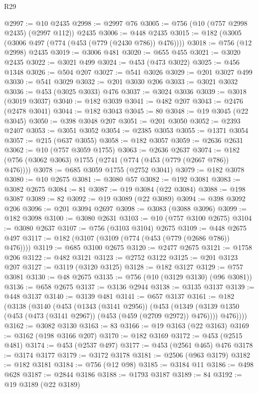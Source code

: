 \begin{lexlean}{R29}
\begin{coremodule}
@2997 := @10 @2435
@2998 := @2997 @76
@3005 := @756 (@10 (@757 @2998 @2435) (@2997 @112)) @2435
@3006 := @448 @2435
@3015 := @182 (@3005 (@3006 @497 (@774 (@453 (@779 (@2430 @786)) @476))))
@3018 := @756 (@12 @2998) @2435
@3019 := @3006 @481
@3020 := @655 @455
@3021 := @3020 @2435
@3022 := @3021 @499
@3024 := @453 (@473 @3022)
@3025 := @456 @1348
@3026 := @504 @207
@3027 := @541 @3026
@3029 := @201 @3027 @499
@3030 := @541 @3029
@3032 := @201 @3030 @206
@3033 := @3021 @3032
@3036 := @453 (@3025 @3033) @476
@3037 := @3024 @3036
@3039 := @3018 (@3019 @3037)
@3040 := @182 @3039
@3041 := @482 @207
@3043 := @2476 (@2478 @3041)
@3044 := @182 @3043
@3045 := 80
@3048 := @19 @3045 (@22 @3045)
@3050 := @398 @3048 @207
@3051 := @201 @3050
@3052 := @2393 @2407
@3053 := @3051 @3052
@3054 := @2385 @3053
@3055 := @1371 @3054
@3057 := @215 (@637 @3055)
@3058 := @182 @3057
@3059 := @2636 @2631
@3062 := @10 (@757 @3059 @1755)
@3063 := @2636 @2637
@3074 := @182 (@756 (@3062 @3063) @1755 (@2741 (@774 (@453 (@779 (@2667 @786)) @476))))
@3078 := @685 @3059 @1755 (@2752 @3041)
@3079 := @182 @3078
@3080 := @10 @2675
@3081 := @3080 @57
@3082 := @192 @3081
@3083 := @3082 @2675
@3084 := 81
@3087 := @19 @3084 (@22 @3084)
@3088 := @198 @3087
@3089 := 82
@3092 := @19 @3089 (@22 @3089)
@3094 := @398 @3092 @206
@3096 := @201 @3094 @2697
@3098 := @3083 (@3088 @3096)
@3099 := @182 @3098
@3100 := @3080 @2631
@3103 := @10 (@757 @3100 @2675)
@3104 := @3080 @2637
@3107 := @756 (@3103 @3104) @2675
@3109 := @448 @2675 @497
@3117 := @182 (@3107 (@3109 (@774 (@453 (@779 (@2686 @786)) @476))))
@3119 := @685 @3100 @2675
@3120 := @2477 @2675
@3121 := @1758 @206
@3122 := @482 @3121
@3123 := @2752 @3122
@3125 := @201 @3123 @207
@3127 := @3119 (@3120 @3125)
@3128 := @182 @3127
@3129 := @757 @3081
@3130 := @48 @2675
@3135 := @756 (@10 (@3129 @3130) (@96 @3081))
@3136 := @658 @2675
@3137 := @3136 @2944
@3138 := @3135 @3137
@3139 := @448 @3137
@3140 := @3139 @481
@3141 := @657 @3137
@3161 := @182
    (@3138
      (@3140
        (@453
          (@1343 (@3141 @2956))
          (@453
            (@1349 (@3139 @1350 (@453 (@473 (@3141 @2967)) (@453 (@459 (@2709 @2972)) @476))))
            @476))))
@3162 := @3082 @3130
@3163 := 83
@3166 := @19 @3163 (@22 @3163)
@3169 := @3162 (@198 @3166 @207)
@3170 := @182 @3169
@3172 := @453 (@2515 @481)
@3174 := @453 (@2537 @497)
@3177 := @453 (@2561 @465) @476
@3178 := @3174 @3177
@3179 := @3172 @3178
@3181 := @2506 (@963 @3179)
@3182 := @182 @3181
@3184 := @756 (@12 @98)
@3185 := @3184 @11
@3186 := @498 @628
@3187 := @2844 @3186
@3188 := @1793 @3187
@3189 := 84
@3192 := @19 @3189 (@22 @3189)

\end{coremodule}
\end{lexlean}
